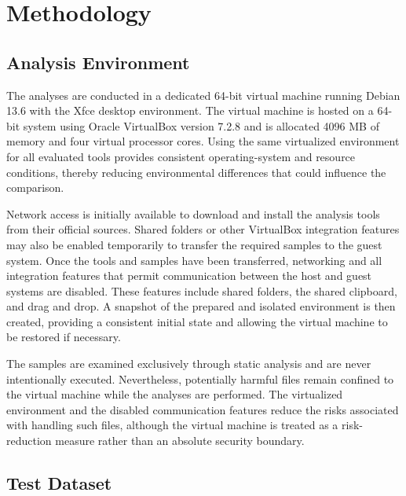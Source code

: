 \cleardoubleoddpage%
\chapter{Methodology}
\label{sec:methodology}


\section{Analysis Environment}
\label{sec:methodology:installation}
The analyses are conducted in a dedicated 64-bit virtual machine running Debian 13.6 with the Xfce desktop environment. The virtual machine is hosted on a 64-bit system using 
Oracle VirtualBox version 7.2.8 and is allocated 4096 MB of memory and four virtual processor cores. Using the same virtualized environment for all evaluated tools 
provides consistent operating-system and resource conditions, thereby reducing environmental differences that could influence the comparison.

Network access is initially available to download and install the analysis tools from their official sources. Shared folders or other VirtualBox integration features may also be 
enabled temporarily to transfer the required samples to the guest system. Once the tools and samples have been transferred, networking and all integration features that permit 
communication between the host and guest systems are disabled. These features include shared folders, the shared clipboard, and drag and drop. A snapshot of the prepared and isolated 
environment is then created, providing a consistent initial state and allowing the virtual machine to be restored if necessary.

The samples are examined exclusively through static analysis and are never intentionally executed. Nevertheless, potentially harmful files remain confined to the virtual machine 
while the analyses are performed. The virtualized environment and the disabled communication features reduce the risks associated with handling such files, although the virtual 
machine is treated as a risk-reduction measure rather than an absolute security boundary.


\section{Test Dataset}
\label{sec:methodology:dataset}


